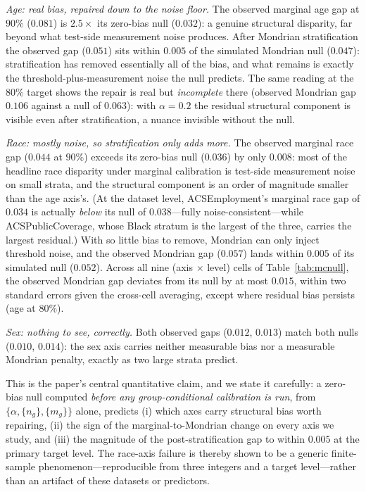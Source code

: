 \documentclass[review,12pt]{elsarticle}
\begin{document}
\emph{Age: real bias, repaired down to the noise floor.} The observed marginal age gap at $90\%$ ($0.081$) is $2.5\times$ its zero-bias null ($0.032$): a genuine structural disparity, far beyond what test-side measurement noise produces. After Mondrian stratification the observed gap ($0.051$) sits within $0.005$ of the simulated Mondrian null ($0.047$): stratification has removed essentially all of the bias, and what remains is exactly the threshold-plus-measurement noise the null predicts. The same reading at the $80\%$ target shows the repair is real but \emph{incomplete} there (observed Mondrian gap $0.106$ against a null of $0.063$): with $\alpha=0.2$ the residual structural component is visible even after stratification, a nuance invisible without the null.

\emph{Race: mostly noise, so stratification only adds more.} The observed marginal race gap ($0.044$ at $90\%$) exceeds its zero-bias null ($0.036$) by only $0.008$: most of the headline race disparity under marginal calibration is test-side measurement noise on small strata, and the structural component is an order of magnitude smaller than the age axis's. (At the dataset level, ACSEmployment's marginal race gap of $0.034$ is actually \emph{below} its null of $0.038$---fully noise-consistent---while ACSPublicCoverage, whose Black stratum is the largest of the three, carries the largest residual.) With so little bias to remove, Mondrian can only inject threshold noise, and the observed Mondrian gap ($0.057$) lands within $0.005$ of its simulated null ($0.052$). Across all nine (axis $\times$ level) cells of Table~\ref{tab:mcnull}, the observed Mondrian gap deviates from its null by at most $0.015$, within two standard errors given the cross-cell averaging, except where residual bias persists (age at $80\%$).

\emph{Sex: nothing to see, correctly.} Both observed gaps ($0.012$, $0.013$) match both nulls ($0.010$, $0.014$): the sex axis carries neither measurable bias nor a measurable Mondrian penalty, exactly as two large strata predict.

This is the paper's central quantitative claim, and we state it carefully: a zero-bias null computed \emph{before any group-conditional calibration is run}, from $\{\alpha, \{n_g\}, \{m_g\}\}$ alone, predicts (i) which axes carry structural bias worth repairing, (ii) the sign of the marginal-to-Mondrian change on every axis we study, and (iii) the magnitude of the post-stratification gap to within $0.005$ at the primary target level. The race-axis failure is thereby shown to be a generic finite-sample phenomenon---reproducible from three integers and a target level---rather than an artifact of these datasets or predictors.
\end{document}
